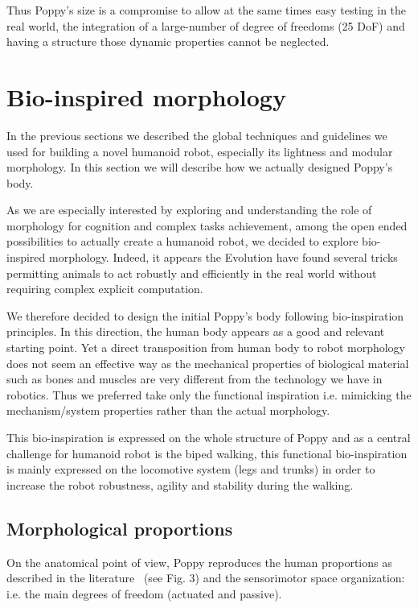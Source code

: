 Thus Poppy's size is a compromise to allow at the same times easy testing in the real world, the integration of a large-number of degree of freedoms (25 DoF) and having a structure those dynamic properties cannot be neglected.

\section{Bio-inspired morphology} %

In the previous sections we described the global techniques and guidelines we used for building a novel humanoid robot, especially its lightness and modular morphology. In this section we will describe how we actually designed Poppy's body.

As we are especially interested by exploring and understanding the role of morphology for cognition and complex tasks achievement, among the open ended possibilities to actually create a humanoid robot, we decided to explore bio-inspired morphology. Indeed, it appears the Evolution have found several tricks permitting animals to act robustly and efficiently in the real world without requiring complex explicit computation.

We therefore decided to design the initial Poppy's body following bio-inspiration principles. In this direction, the human body appears as a good and relevant starting point. Yet a direct transposition from human body to robot morphology does not seem an effective way as the mechanical properties of biological material such as bones and muscles are very different from the technology we have in robotics. Thus we preferred take only the functional inspiration i.e. mimicking the mechanism/system properties rather than the actual morphology.

This bio-inspiration is expressed on the whole structure of Poppy and as a central challenge for humanoid robot is the biped walking, this functional bio-inspiration is mainly expressed on the locomotive system (legs and trunks) in order to increase the robot robustness, agility and stability during the walking.


\subsection{Morphological proportions} %

On the anatomical point of view, Poppy reproduces the human proportions as described in the literature~\cite{dufour2005biomecanique} (see Fig. 3) and the sensorimotor space organization: i.e. the main degrees of freedom (actuated and passive).

